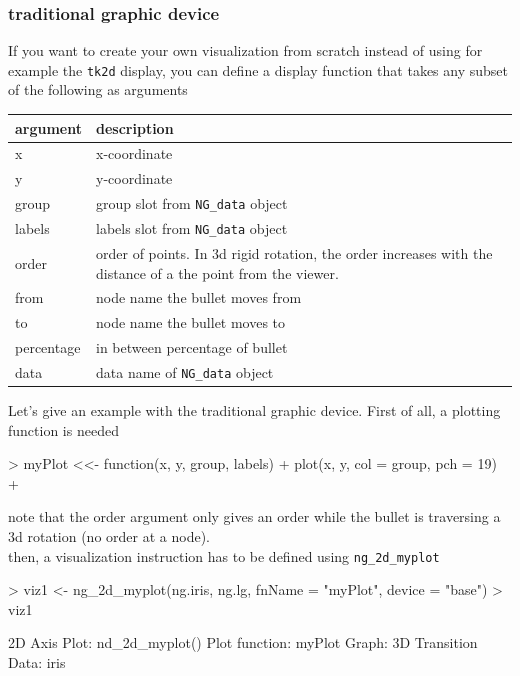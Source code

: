 \documentclass[12pt,oneside,titlepage,letter]{article}
\newcommand{\modify}[1]{{\color{blue}#1}}
\begin{document}
\subsubsection{traditional graphic device}
If you want to create your own visualization from scratch instead of using for example the \texttt{tk2d} display, you can define a display function that takes any subset of the following as arguments\\
\begin{center}
 
\begin{tabular}{lp{10cm}}
    \textbf{argument} & \textbf{description}\\ \hline
    x & x-coordinate \\
    y & y-coordinate \\
    group & group slot from \texttt{NG\_data} object\\
    labels & labels slot from \texttt{NG\_data} object\\
    order & order of points. In 3d rigid rotation, the order increases with the distance  of a the point from the viewer.\\
    from & node name the bullet moves from\\
    to & node name the bullet moves to\\
    percentage & in between percentage of bullet\\
    data & data name of \texttt{NG\_data} object  
\end{tabular}
\end{center}

\vspace{1em}
Let's give an example with the traditional graphic device. First of all, a plotting function is needed
\begin{Schunk}
\begin{Sinput}
> myPlot <<- function(x, y, group, labels) {
+     plot(x, y, col = group, pch = 19)
+ }
\end{Sinput}
\end{Schunk}
\modify{note that the order argument only gives an order while the bullet is traversing a 3d rotation (no order at a node).}\\
then, a visualization instruction has to be defined using \texttt{ng\_2d\_myplot}
\begin{Schunk}
\begin{Sinput}
> viz1 <- ng_2d_myplot(ng.iris, ng.lg, fnName = "myPlot", device = "base")
> viz1
\end{Sinput}
\begin{Soutput}
2D Axis Plot: nd_2d_myplot()
Plot function: myPlot 
Graph: 3D Transition 
Data: iris 
\end{Soutput}
\end{Schunk}
\end{document}
